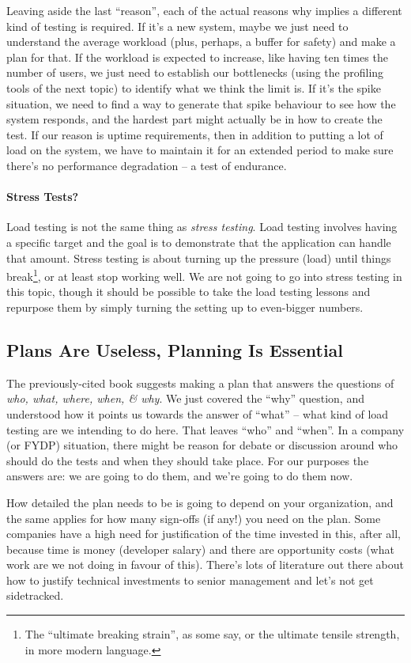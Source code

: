 Leaving aside the last ``reason'', each of the actual reasons why implies a different kind of testing is required. If it's a new system, maybe we just need to understand the average workload (plus, perhaps, a buffer for safety) and make a plan for that. If the workload is expected to increase, like having ten times the number of users, we just need to establish our bottlenecks (using the profiling tools of the next topic) to identify what we think the limit is. If it's the spike situation, we need to find a way to generate that spike behaviour to see how the system responds, and the hardest part might actually be in how to create the test. If our reason is uptime requirements, then in addition to putting a lot of load on the system, we have to maintain it for an extended period to make sure there's no performance degradation -- a test of endurance.

\paragraph{Stress Tests?} Load testing is not the same thing as \textit{stress testing}. Load testing involves having a specific target and the goal is to demonstrate that the application can handle that amount. Stress testing is about turning up the pressure (load) until things break\footnote{The ``ultimate breaking strain'', as some say, or the ultimate tensile strength, in more modern language.}, or at least stop working well. We are not going to go into stress testing in this topic, though it should be possible to take the load testing lessons and repurpose them by simply turning the setting up to even-bigger numbers.

\subsection*{Plans Are Useless, Planning Is Essential} The previously-cited book suggests making a plan that answers the questions of \textit{who, what, where, when, \& why}. We just covered the ``why'' question, and understood how it points us towards the answer of ``what'' -- what kind of load testing are we intending to do here. That leaves ``who'' and ``when''. In a company (or FYDP) situation, there might be reason for debate or discussion around who should do the tests and when they should take place. For our purposes the answers are: we are going to do them, and we're going to do them now.

How detailed the plan needs to be is going to depend on your organization, and the same applies for how many sign-offs (if any!) you need on the plan. Some companies have a high need for justification of the time invested in this, after all, because time is money (developer salary) and there are opportunity costs (what work are we not doing in favour of this). There's lots of literature out there about how to justify technical investments to senior management and let's not get sidetracked.

